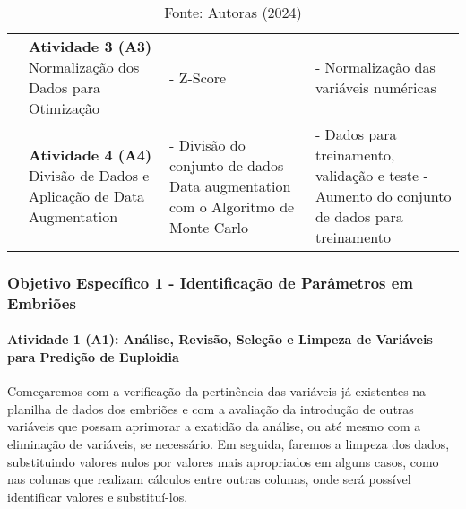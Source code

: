 \begin{table}[h!]
{\begin{tabular}{|p{3cm}|p{4cm}|p{3cm}|p{5cm}|}
      \cline{2-4}

      \cellcolor[HTML]{133e78} & 
      \textcolor[HTML]{133E78}{\textbf{Atividade 3 (A3)}} \newline
      Normalização dos Dados para Otimização &
      - Z-Score &
      - Normalização das variáveis numéricas \\

      \cline{2-4}

      \cellcolor[HTML]{133e78} & 
      \vspace{0.2cm} \textcolor[HTML]{133E78}{\textbf{Atividade 4 (A4)}} \newline
      Divisão de Dados e Aplicação de Data Augmentation \vspace{0.2cm} & 
      - Divisão do conjunto de dados \newline
      - Data augmentation com o Algoritmo de Monte Carlo &
      - Dados para treinamento, validação e teste \newline
      - Aumento do conjunto de dados para treinamento \\

      \hline
    \end{tabular}
  }
  \caption*{\scriptsize Fonte: Autoras (2024)}
\end{table} 
\FloatBarrier  %

\subsubsection{\textbf{Objetivo Específico 1} - Identificação de Parâmetros em Embriões}

\paragraph{\textbf{Atividade 1 (A1):} Análise, Revisão, Seleção e Limpeza de Variáveis para Predição de Euploidia}

Começaremos com a verificação da pertinência das variáveis já existentes na planilha de dados dos embriões e com a avaliação da introdução de outras variáveis que possam aprimorar a exatidão da análise, ou até mesmo com a eliminação de variáveis, se necessário. Em seguida, faremos a limpeza dos dados, substituindo valores nulos por valores mais apropriados em alguns casos, como nas colunas que realizam cálculos entre outras colunas, onde será possível identificar valores e substituí-los.

